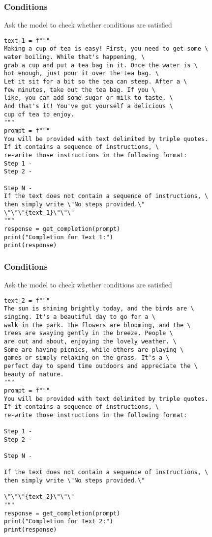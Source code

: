 \begin{frame}[fragile]\frametitle{Conditions}

Ask the model to check whether conditions are satisfied

{\tiny
\begin{lstlisting}
text_1 = f"""
Making a cup of tea is easy! First, you need to get some \ 
water boiling. While that's happening, \ 
grab a cup and put a tea bag in it. Once the water is \ 
hot enough, just pour it over the tea bag. \ 
Let it sit for a bit so the tea can steep. After a \ 
few minutes, take out the tea bag. If you \ 
like, you can add some sugar or milk to taste. \ 
And that's it! You've got yourself a delicious \ 
cup of tea to enjoy.
"""
prompt = f"""
You will be provided with text delimited by triple quotes. 
If it contains a sequence of instructions, \ 
re-write those instructions in the following format:
Step 1 -
Step 2 -

Step N -
If the text does not contain a sequence of instructions, \ 
then simply write \"No steps provided.\"
\"\"\"{text_1}\"\"\"
"""
response = get_completion(prompt)
print("Completion for Text 1:")
print(response)
\end{lstlisting}
}
		
\end{frame}


\begin{frame}[fragile]\frametitle{Conditions}

Ask the model to check whether conditions are satisfied

{\tiny 
\begin{lstlisting}
text_2 = f"""
The sun is shining brightly today, and the birds are \
singing. It's a beautiful day to go for a \ 
walk in the park. The flowers are blooming, and the \ 
trees are swaying gently in the breeze. People \ 
are out and about, enjoying the lovely weather. \ 
Some are having picnics, while others are playing \ 
games or simply relaxing on the grass. It's a \ 
perfect day to spend time outdoors and appreciate the \ 
beauty of nature.
"""
prompt = f"""
You will be provided with text delimited by triple quotes. 
If it contains a sequence of instructions, \ 
re-write those instructions in the following format:

Step 1 - 
Step 2 -

Step N -

If the text does not contain a sequence of instructions, \ 
then simply write \"No steps provided.\"

\"\"\"{text_2}\"\"\"
"""
response = get_completion(prompt)
print("Completion for Text 2:")
print(response)
\end{lstlisting}
}
		
\end{frame}


